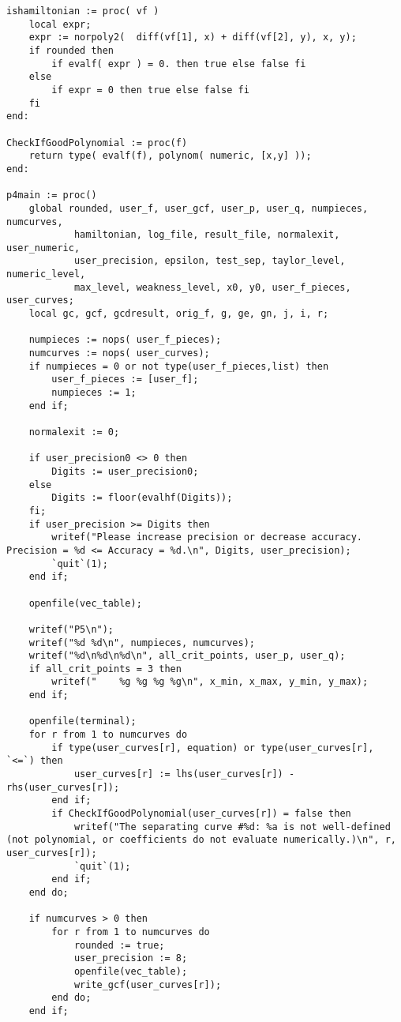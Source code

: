 \documentclass[a4paper,10pt]{article}
\begin{document}
\begin{lstlisting}[name=main]
ishamiltonian := proc( vf )
    local expr;
    expr := norpoly2(  diff(vf[1], x) + diff(vf[2], y), x, y);
    if rounded then
        if evalf( expr ) = 0. then true else false fi
    else
        if expr = 0 then true else false fi
    fi
end:

CheckIfGoodPolynomial := proc(f)
    return type( evalf(f), polynom( numeric, [x,y] ));
end:

p4main := proc()
    global rounded, user_f, user_gcf, user_p, user_q, numpieces, numcurves,
            hamiltonian, log_file, result_file, normalexit, user_numeric,
            user_precision, epsilon, test_sep, taylor_level, numeric_level,
            max_level, weakness_level, x0, y0, user_f_pieces, user_curves;
    local gc, gcf, gcdresult, orig_f, g, ge, gn, j, i, r;

    numpieces := nops( user_f_pieces);
    numcurves := nops( user_curves);
    if numpieces = 0 or not type(user_f_pieces,list) then
        user_f_pieces := [user_f];
        numpieces := 1;
    end if;

    normalexit := 0;

    if user_precision0 <> 0 then
        Digits := user_precision0;
    else
        Digits := floor(evalhf(Digits));
    fi;
    if user_precision >= Digits then
        writef("Please increase precision or decrease accuracy. Precision = %d <= Accuracy = %d.\n", Digits, user_precision);
        `quit`(1);
    end if;

    openfile(vec_table);

    writef("P5\n");
    writef("%d %d\n", numpieces, numcurves);
    writef("%d\n%d\n%d\n", all_crit_points, user_p, user_q);
    if all_crit_points = 3 then
        writef("    %g %g %g %g\n", x_min, x_max, y_min, y_max);
    end if;

    openfile(terminal);
    for r from 1 to numcurves do
        if type(user_curves[r], equation) or type(user_curves[r], `<=`) then
            user_curves[r] := lhs(user_curves[r]) - rhs(user_curves[r]);
        end if;
        if CheckIfGoodPolynomial(user_curves[r]) = false then
            writef("The separating curve #%d: %a is not well-defined (not polynomial, or coefficients do not evaluate numerically.)\n", r, user_curves[r]);
            `quit`(1);
        end if;
    end do;

    if numcurves > 0 then
        for r from 1 to numcurves do
            rounded := true;
            user_precision := 8;
            openfile(vec_table);
            write_gcf(user_curves[r]);
        end do;
    end if;


\end{lstlisting}
\end{document}

